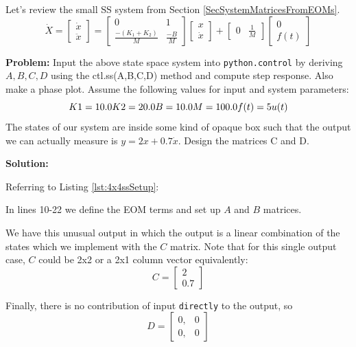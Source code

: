 \begin{ExampleSmall}
    Let's review the small SS system from Section \ref{SecSystemMatricesFromEOMs}.
    \[
    \dot{X} =
    \begin{bmatrix}\dot{x} \\ \ddot{x} \end{bmatrix} =
    \begin{bmatrix}0&1\\\frac{-(K_1+K_2)}{M}&\frac{-B}{M}\end{bmatrix}
    \begin{bmatrix}x\\ \dot{x}\end{bmatrix}+
    \begin{bmatrix}0&\frac{1}{M}\end{bmatrix}
    \begin{bmatrix}0\\f(t)\end{bmatrix}
    \]

{\bf Problem: }  Input the above state space system into {\tt python.control}
by deriving $A,B,C,D$ using the
ctl.ss(A,B,C,D) method
and compute step response. Also make a phase plot.   Assume the following
values for input and system parameters:
\[
    K1 = 10.0\\
    K2 = 20.0\\
    B = 10.0\\
    M = 100.0\\
    f(t) = 5u(t)
\]
The states of our system are inside some kind of opaque box such that the output
we can actually measure
is $y = 2x+0.7\dot{x}$.   Design the
matrices C and D.

\noindent
{\bf Solution:}

Referring to Listing \ref{lst:4x4ssSetup}:

In lines 10-22 we define the EOM terms and set up $A$ and $B$ matrices.

We have this unusual output in which the output is a linear combination
of the states which we implement with the $C$ matrix.
Note that for this single output case, $C$ could be 2x2 or a 2x1 column vector
equivalently:
\[
C = \begin{bmatrix} 2 \\ 0.7 \end{bmatrix}
\]


Finally,
there is no contribution of input {\tt directly} to the output, so
\[
D= \begin{bmatrix} 0,&0\\0,&0 \end{bmatrix}
\]



\end{ExampleSmall}

